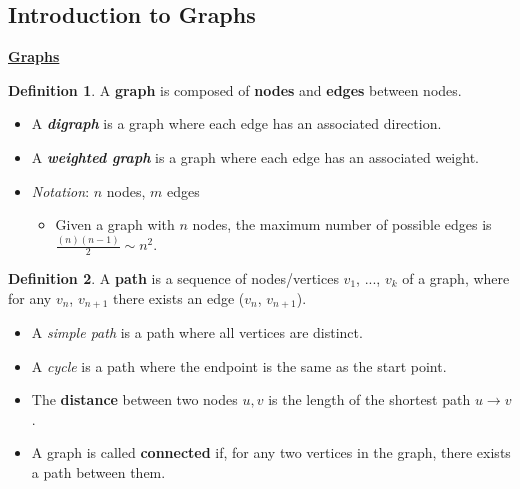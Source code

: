 \documentclass[12pt]{extarticle}
\theoremstyle{definition}
\newtheorem*{definition}{Definition}
\theoremstyle{remark}
\begin{document}
\subsection{Introduction to Graphs}

\noindent\ul{\textbf{Graphs}}
\begin{definition}
    A \textbf{graph} is composed of \textbf{nodes} and \textbf{edges} between nodes. \begin{itemize}
        \item A \textbf{\textit{digraph}} is a graph where each edge has an associated direction.
        \item A \textbf{\textit{weighted graph}} is a graph where each edge has an associated weight.
        \item\textit{Notation}: $n$ nodes, $m$ edges \begin{itemize}
            \item Given a graph with $n$ nodes, the maximum number of possible edges is $\frac{(n)(n-1)}{2}\sim n^2$.
        \end{itemize}
    \end{itemize}
\end{definition}

\begin{center}
\end{center}

\begin{definition}
    A \textbf{path} is a sequence of nodes/vertices $v_1$, ..., $v_k$ of a graph, where for any $v_n$, $v_{n+1}$ there exists an edge ($v_n$, $v_{n+1}$). \begin{itemize}
        \item A \textit{simple path} is a path where all vertices are distinct.
        \item A \textit{cycle} is a path where the endpoint is the same as the start point.
        \item The \textbf{distance} between two nodes $u,v$ is the length of the shortest path $u\to v$.
        \item A graph is called \textbf{connected} if, for any two vertices in the graph, there exists a path between them.
    \end{itemize}
\end{definition}
\end{document}
